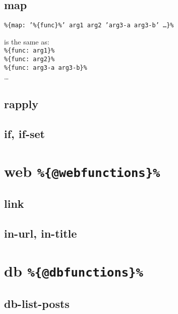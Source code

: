 \documentclass{memoir}
\newcommand{\var}[1]{\texttt{\%\{#1\}\%}}
\begin{document}
		\subsection{map} %
			\var{map: '\var{func}' arg1 arg2 'arg3-a arg3-b' \ldots}

			is the same as:\\
			\var{func: arg1}\\
			\var{func: arg2}\\
			\var{func: arg3-a arg3-b}\\
			\ldots


		\subsection{rapply}

		\subsection{if, if-set} %




	\section{web \var{@webfunctions}} %

		\subsection{link}
		\subsection{in-url, in-title}


	\section{db \var{@dbfunctions}} %

		\subsection{db-list-posts}




\printglossary
\end{document}

